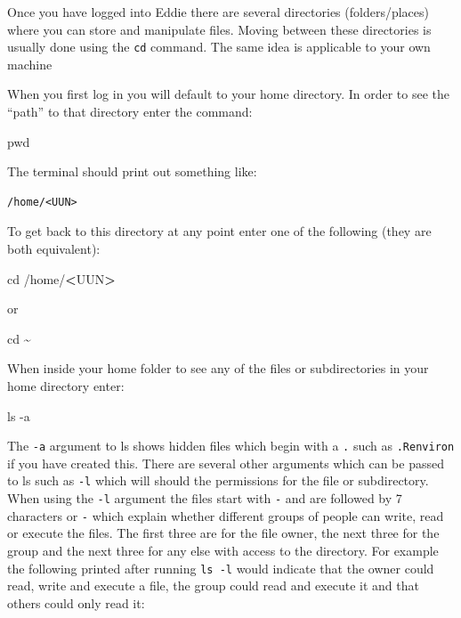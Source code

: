 \documentclass[
]{book}
\newenvironment{Shaded}{\begin{snugshade}}{\end{snugshade}}
\newcommand{\AttributeTok}[1]{\textcolor[rgb]{0.77,0.63,0.00}{#1}}
\newcommand{\BuiltInTok}[1]{#1}
\newcommand{\FunctionTok}[1]{\textcolor[rgb]{0.00,0.00,0.00}{#1}}
\newcommand{\NormalTok}[1]{#1}
\newcommand{\OperatorTok}[1]{\textcolor[rgb]{0.81,0.36,0.00}{\textbf{#1}}}
\begin{document}
Once you have logged into Eddie there are several directories (folders/places) where you can store and manipulate files. Moving between these directories is usually done using the \texttt{cd} command. The same idea is applicable to your own machine

When you first log in you will default to your home directory. In order to see the ``path'' to that directory enter the command:

\begin{Shaded}
\begin{Highlighting}[]
\BuiltInTok{pwd}
\end{Highlighting}
\end{Shaded}

The terminal should print out something like:

\begin{verbatim}
/home/<UUN>
\end{verbatim}

To get back to this directory at any point enter one of the following (they are both equivalent):

\begin{Shaded}
\begin{Highlighting}[]
\BuiltInTok{cd}\NormalTok{ /home/}\OperatorTok{\textless{}}\NormalTok{UUN}\OperatorTok{\textgreater{}}
\end{Highlighting}
\end{Shaded}

or

\begin{Shaded}
\begin{Highlighting}[]
\BuiltInTok{cd}\NormalTok{ \textasciitilde{}}
\end{Highlighting}
\end{Shaded}

When inside your home folder to see any of the files or subdirectories in your home directory enter:

\begin{Shaded}
\begin{Highlighting}[]
\FunctionTok{ls} \AttributeTok{{-}a}
\end{Highlighting}
\end{Shaded}

The \texttt{-a} argument to ls shows hidden files which begin with a \texttt{.} such as \texttt{.Renviron} if you have created this. There are several other arguments which can be passed to ls such as \texttt{-l} which will should the permissions for the file or subdirectory. When using the \texttt{-l} argument the files start with \texttt{-} and are followed by 7 characters or \texttt{-} which explain whether different groups of people can write, read or execute the files. The first three are for the file owner, the next three for the group and the next three for any else with access to the directory. For example the following printed after running \texttt{ls\ -l} would indicate that the owner could read, write and execute a file, the group could read and execute it and that others could only read it:
\end{document}
